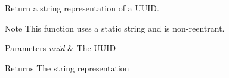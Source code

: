 Return a string representation of a U\+U\+ID. 

\begin{DoxyNote}{Note}
This function uses a static string and is non-\/reentrant.
\end{DoxyNote}

\begin{DoxyParams}{Parameters}
{\em uuid} & The U\+U\+ID\\
\hline
\end{DoxyParams}
\begin{DoxyReturn}{Returns}
The string representation 
\end{DoxyReturn}

